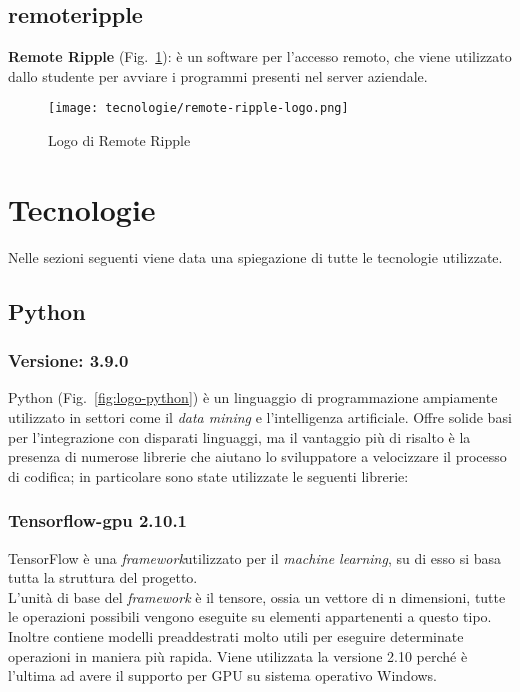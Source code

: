 \subsection{remoteripple}
\textbf{Remote Ripple} (Fig.~\ref{fig:logo-remoteripple}): è un software per l'accesso remoto, che viene utilizzato dallo studente per avviare i programmi presenti nel server aziendale.
    
\begin{figure}[!h] 
    \centering 
    \texttt{[image: tecnologie/remote-ripple-logo.png]} 
    \caption{Logo di Remote Ripple}
    \label{fig:logo-remoteripple}
  \end{figure}


\newpage

\section{Tecnologie}
\label{sec:tecnologie-strumenti}

Nelle sezioni seguenti viene data una spiegazione di tutte le tecnologie utilizzate.

\subsection{Python}

\subsubsection{Versione: 3.9.0}
Python (Fig.~\ref{fig:logo-python}) è un linguaggio di programmazione ampiamente utilizzato in settori come il \emph{data mining} e l'intelligenza artificiale. 
Offre solide basi per l'integrazione con disparati linguaggi, ma il vantaggio più di risalto è la presenza di numerose librerie che aiutano lo sviluppatore a velocizzare il processo di codifica; in particolare sono state utilizzate le seguenti librerie:

\subsubsection{\label{tec:tensorflow}Tensorflow-gpu 2.10.1}

TensorFlow è una \emph{framework}\glsfirstoccur utilizzato per il \emph{machine learning}, su di esso si basa tutta la struttura del progetto.\\
L'unità di base del \emph{framework} è il tensore, ossia un vettore di n dimensioni, tutte le operazioni possibili vengono eseguite su elementi appartenenti a questo tipo.
Inoltre contiene modelli preaddestrati molto utili per eseguire determinate operazioni in maniera più rapida. 
Viene utilizzata la versione 2.10 perché è l'ultima ad avere il supporto per GPU su sistema operativo Windows.

